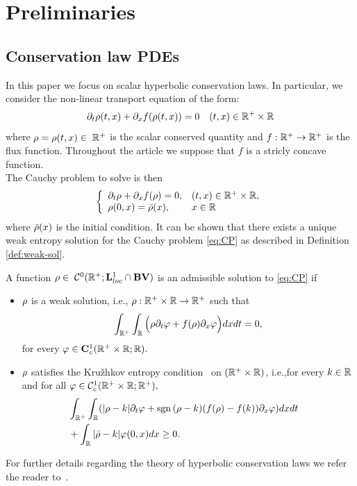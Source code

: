 \section{Preliminaries\label{sec:Preliminaries}}


\subsection{Conservation law PDEs\label{sub:Hyperbolic-PDE's}}

In this paper we focus on scalar hyperbolic conservation laws. In particular, we consider the non-linear transport equation of the form:
\begin{equation}
\partial_t\cvar\left(t,x\right)+\partial_x f\left(\cvar\left(t,x\right)\right)=0 \quad (t,x) \in \R^+ \times \R\label{eq:cons}
\end{equation}
where $\rho=\rho(t,x) \in \; \mathbb{R}^+$ is the scalar conserved quantity and $f:\mathbb{R}^+\rightarrow \mathbb{R}^+$ is the flux function. Throughout the article we suppose that $f$ is a stricly concave function. \\
The Cauchy problem to solve is then 
\begin{equation}
	\label{eq:CP}
		\left\{
		\begin{array}{ll}
		\partial_t \cvar+ \partial_x f(\cvar) =0, & (t,x)\in\R^+\times \R,\\
		\cvar(0,x)=\initstate(x), & x \in \R\\
		\end{array}
		\right.
\end{equation}
where $\bar{\rho}(x)$ is the initial condition.
It can be shown that there exists a unique weak entropy solution for the Cauchy problem \eqref{eq:CP} as described in Definition \ref{def:weak-sol}. 
\begin{defn}\label{def:weak-sol}
A function $\rho \in \; \mathcal{C}^0(\mathbb{R}^+; \mathbf{L}^1_{loc}\cap \mathbf{BV})$ is an admissible solution to \eqref{eq:CP} if
\begin{itemize}
	\item $\rho$ is a weak solution, i.e., $\rho : \mathbb{R}^+\times\mathbb{R}\rightarrow \mathbb{R}^+$ such that
		\begin{equation}	
		\int_{\mathbb{R}^+}\int_{\mathbb{R}}\Big( \rho \partial_t\varphi +f(\rho)\partial_x\varphi \Big)dxdt=0, 
\end{equation}
for every $\varphi \in \mathbf{C}^1_c(\mathbb{R}^+\times \mathbb{R}; \mathbb{R}).$
	\item $\rho$ satisfies the Kru\v{z}hkov entropy condition~\cite{Kruzkov1970} on $(\mathbb{R}^+\times\mathbb{R})$, i.e.,for every $k\in \mathbb{R}$ and for all $\varphi \in \mathcal{C}^1_c(\mathbb{R}^+\times \mathbb{R};\mathbb{R}^+),$
\begin{eqnarray}
\label{eq:kruzhkov}
	&\int_{\R^+}\int_{\R}(\modulo{\cvar -k}  \partial_t \varphi + \sgn{(\cvar-k }) (f(\cvar)-f(k))\partial_x\varphi)dxdt& \nonumber\\
	 &+\int_{\R}\modulo{\initstate-k}\varphi(0,x)dx\geq 0.&
\end{eqnarray} 
\end{itemize}
\end{defn}
For further details regarding the theory of hyperbolic conservation laws we refer the reader to~\cite{garavello2006traffic,Evans1998}.

